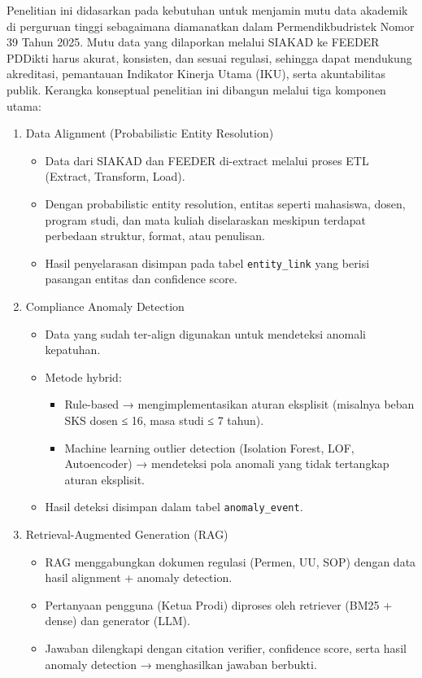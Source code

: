 \documentclass[12pt,a4paper,oneside]{report}
\begin{document}
        Penelitian ini didasarkan pada kebutuhan untuk menjamin mutu data akademik di perguruan tinggi sebagaimana diamanatkan dalam
        Permendikbudristek Nomor 39 Tahun 2025. Mutu data yang dilaporkan melalui SIAKAD ke FEEDER PDDikti harus akurat,
        konsisten, dan sesuai regulasi, sehingga dapat mendukung akreditasi, pemantauan Indikator Kinerja Utama (IKU), serta akuntabilitas publik.
        Kerangka konseptual penelitian ini dibangun melalui tiga komponen utama:
        \begin{enumerate}
            \item Data Alignment (Probabilistic Entity Resolution)
                \begin{itemize}
                    \item Data dari SIAKAD dan FEEDER di-extract melalui proses ETL (Extract, Transform, Load).
                    \item Dengan probabilistic entity resolution, entitas seperti mahasiswa, dosen, program studi, dan mata kuliah diselaraskan meskipun terdapat perbedaan struktur, format, atau penulisan.
                    \item Hasil penyelarasan disimpan pada tabel \texttt{entity\_link} yang berisi pasangan entitas dan confidence score.
                \end{itemize}
            \item Compliance Anomaly Detection
                \begin{itemize}
                    \item Data yang sudah ter-align digunakan untuk mendeteksi anomali kepatuhan.
                    \item Metode hybrid:
                        \begin{itemize}
                            \item Rule-based → mengimplementasikan aturan eksplisit (misalnya beban SKS dosen ≤ 16, masa studi ≤ 7 tahun).
                            \item Machine learning outlier detection (Isolation Forest, LOF, Autoencoder) → mendeteksi pola anomali yang tidak tertangkap aturan eksplisit.
                        \end{itemize}
                    \item Hasil deteksi disimpan dalam tabel \texttt{anomaly\_event}.
                \end{itemize}
            \item Retrieval-Augmented Generation (RAG)
                \begin{itemize}
                    \item RAG menggabungkan dokumen regulasi (Permen, UU, SOP) dengan data hasil alignment + anomaly detection.
                    \item Pertanyaan pengguna (Ketua Prodi) diproses oleh retriever (BM25 + dense) dan generator (LLM).
                    \item Jawaban dilengkapi dengan citation verifier, confidence score, serta hasil anomaly detection → menghasilkan jawaban berbukti.
                \end{itemize}
        \end{enumerate}
\end{document}
